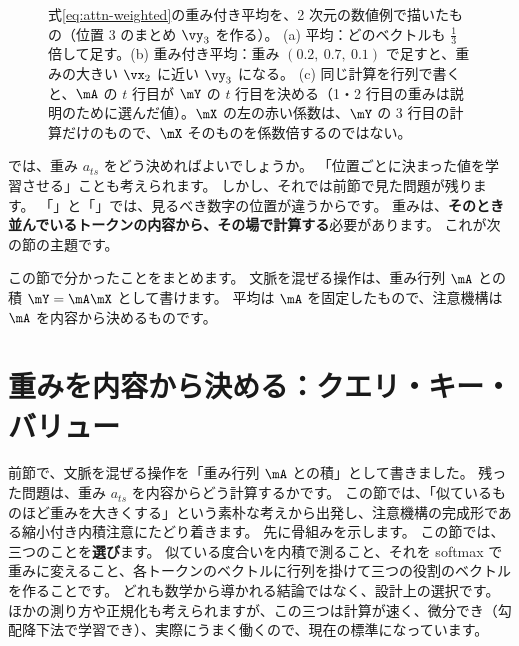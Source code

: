 \begin{figure}[tbp]
\caption{式\eqref{eq:attn-weighted}の重み付き平均を、2 次元の数値例で描いたもの（位置 3 のまとめ $\vy_3$ を作る）。
(a) 平均：どのベクトルも $\frac13$ 倍して足す。(b) 重み付き平均：重み $(0.2,\ 0.7,\ 0.1)$ で足すと、重みの大きい $\vx_2$ に近い $\vy_3$ になる。
(c) 同じ計算を行列で書くと、$\mA$ の $t$ 行目が $\mY$ の $t$ 行目を決める（1・2 行目の重みは説明のために選んだ値）。$\mX$ の左の赤い係数は、$\mY$ の 3 行目の計算だけのもので、$\mX$ そのものを係数倍するのではない。}
\label{fig:attn-weighted-calc}
\end{figure}

では、重み $a_{ts}$ をどう決めればよいでしょうか。
「位置ごとに決まった値を学習させる」ことも考えられます。
しかし、それでは前節で見た問題が残ります。
「」と「」では、見るべき数字の位置が違うからです。
重みは、\textbf{そのとき並んでいるトークンの内容から、その場で計算する}必要があります。
これが次の節の主題です。

この節で分かったことをまとめます。
文脈を混ぜる操作は、重み行列 $\mA$ との積 $\mY=\mA\mX$ として書けます。
平均は $\mA$ を固定したもので、注意機構は $\mA$ を内容から決めるものです。

\section{重みを内容から決める：クエリ・キー・バリュー}\label{sec:attn-qkv}

前節で、文脈を混ぜる操作を「重み行列 $\mA$ との積」として書きました。
残った問題は、重み $a_{ts}$ を内容からどう計算するかです。
この節では、「似ているものほど重みを大きくする」という素朴な考えから出発し、注意機構の完成形である縮小付き内積注意にたどり着きます。
先に骨組みを示します。
この節では、三つのことを\textbf{選び}ます。
似ている度合いを内積で測ること、それを softmax で重みに変えること、各トークンのベクトルに行列を掛けて三つの役割のベクトルを作ることです。
どれも数学から導かれる結論ではなく、設計上の選択です。
ほかの測り方や正規化も考えられますが、この三つは計算が速く、微分でき（勾配降下法で学習でき）、実際にうまく働くので、現在の標準になっています。

